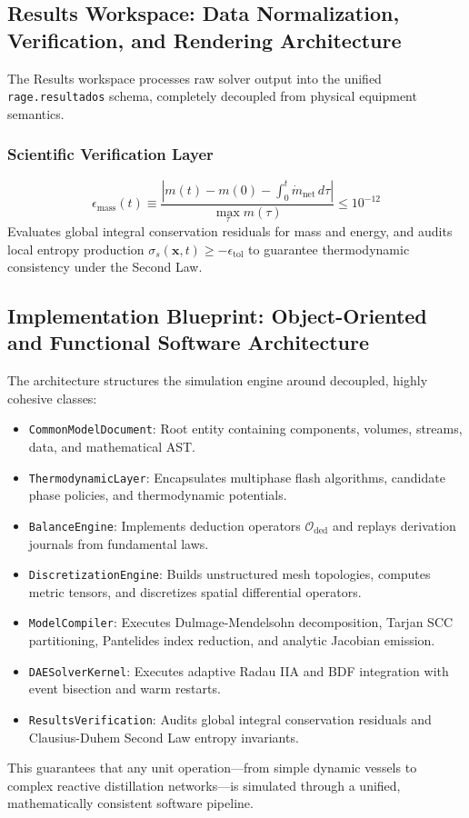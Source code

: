 \documentclass[11pt,a4paper]{article}
\begin{document}
\subsection{Results Workspace: Data Normalization, Verification, and Rendering Architecture}
\label{subsec:results-workspace-verification}

The Results workspace processes raw solver output into the unified \texttt{rage.resultados} schema, completely decoupled from physical equipment semantics.
\subsubsection{Scientific Verification Layer}
\begin{equation}
\epsilon_{\text{mass}}(t) \equiv \frac{\left| m(t) - m(0) - \int_0^t \dot{m}_{\text{net}} \, d\tau \right|}{\max_\tau m(\tau)} \le 10^{-12}
\end{equation}
Evaluates global integral conservation residuals for mass and energy, and audits local entropy production $\sigma_s(\mathbf{x}, t) \ge -\epsilon_{\text{tol}}$ to guarantee thermodynamic consistency under the Second Law.

\subsection{Implementation Blueprint: Object-Oriented and Functional Software Architecture}
\label{subsec:software-architecture-blueprint}

The architecture structures the simulation engine around decoupled, highly cohesive classes:
\begin{itemize}[leftmargin=*]
    \item \texttt{CommonModelDocument}: Root entity containing components, volumes, streams, data, and mathematical AST.
    \item \texttt{ThermodynamicLayer}: Encapsulates multiphase flash algorithms, candidate phase policies, and thermodynamic potentials.
    \item \texttt{BalanceEngine}: Implements deduction operators $\mathcal{O}_{\text{ded}}$ and replays derivation journals from fundamental laws.
    \item \texttt{DiscretizationEngine}: Builds unstructured mesh topologies, computes metric tensors, and discretizes spatial differential operators.
    \item \texttt{ModelCompiler}: Executes Dulmage-Mendelsohn decomposition, Tarjan SCC partitioning, Pantelides index reduction, and analytic Jacobian emission.
    \item \texttt{DAESolverKernel}: Executes adaptive Radau IIA and BDF integration with event bisection and warm restarts.
    \item \texttt{ResultsVerification}: Audits global integral conservation residuals and Clausius-Duhem Second Law entropy invariants.
\end{itemize}
This guarantees that any unit operation—from simple dynamic vessels to complex reactive distillation networks—is simulated through a unified, mathematically consistent software pipeline.
\end{document}
